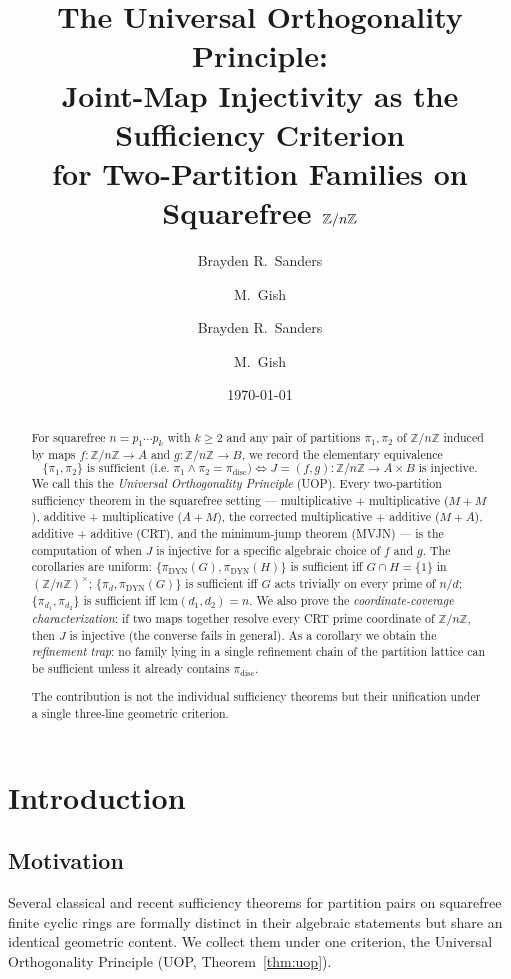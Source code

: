 \documentclass[11pt,reqno]{amsart}
\title[The Universal Orthogonality Principle]{The Universal Orthogonality Principle:\\
Joint-Map Injectivity as the Sufficiency Criterion\\
for Two-Partition Families on Squarefree $\Z/n\Z$}
\author{Brayden R.\ Sanders \and M.\ Gish}
\author{Brayden R.\ Sanders \and M.\ Gish}
\date{\today}
\theoremstyle{plain}
\theoremstyle{definition}
\newcommand{\Z}{\mathbb{Z}}
\newcommand{\Zn}{\Z/n\Z}
\newcommand{\Zns}{(\Z/n\Z)^{\times}}
\newcommand{\meet}{\wedge}
\newcommand{\disc}{\mathrm{disc}}
\newcommand{\DYN}{\mathrm{DYN}}
\newcommand{\lcm}{\mathrm{lcm}}
\begin{document}
\begin{abstract}
For squarefree $n = p_1 \cdots p_k$ with $k \geq 2$ and any pair of partitions $\pi_1, \pi_2$ of $\Zn$ induced by maps $f \colon \Zn \to A$ and $g \colon \Zn \to B$, we record the elementary equivalence
\[
\{\pi_1,\pi_2\} \text{ is sufficient (i.e.\ } \pi_1 \meet \pi_2 = \pi_{\disc} \text{)} \iff
J = (f,g)\colon \Zn \to A \times B \text{ is injective}.
\]
We call this the \emph{Universal Orthogonality Principle} (UOP). Every two-partition sufficiency theorem in the squarefree setting --- multiplicative + multiplicative ($M{+}M$), additive + multiplicative ($A{+}M$), the corrected multiplicative + additive ($M{+}A$), additive + additive (CRT), and the minimum-jump theorem (MVJN) --- is the computation of when $J$ is injective for a specific algebraic choice of $f$ and $g$. The corollaries are uniform: $\{\pi_{\DYN}(G), \pi_{\DYN}(H)\}$ is sufficient iff $G \cap H = \{1\}$ in $\Zns$; $\{\pi_d, \pi_{\DYN}(G)\}$ is sufficient iff $G$ acts trivially on every prime of $n/d$; $\{\pi_{d_1}, \pi_{d_2}\}$ is sufficient iff $\lcm(d_1,d_2) = n$. We also prove the \emph{coordinate-coverage characterization}: if two maps together resolve every CRT prime coordinate of $\Zn$, then $J$ is injective (the converse fails in general). As a corollary we obtain the \emph{refinement trap}: no family lying in a single refinement chain of the partition lattice can be sufficient unless it already contains $\pi_{\disc}$.

The contribution is not the individual sufficiency theorems but their unification under a single three-line geometric criterion.
\end{abstract}

\maketitle

\section{Introduction}

\subsection{Motivation}

Several classical and recent sufficiency theorems for partition pairs on squarefree finite cyclic rings are formally distinct in their algebraic statements but share an identical geometric content. We collect them under one criterion, the Universal Orthogonality Principle (UOP, Theorem~\ref{thm:uop}).
\end{document}
